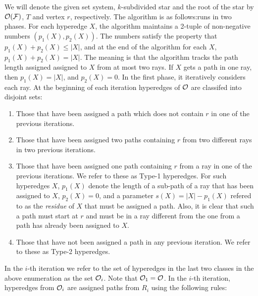 \documentclass[11pt,letter]{../lib/llncs}
\def\cF{{\cal F}}
\def\cO{{\cal O}}
\def\xnoindent{\noindent} %
\begin{document}
\xnoindent We will denote the given set system, $k$-subdivided star and the root of the
star by $\cO(\cF)$, $T$ and vertex $r$, respectively.  
 The algorithm is as follows:runs in two phases. For each hyperedge $X$, the algorithm maintains a 2-tuple of non-negative numbers $(p_1(X),p_2(X))$.  The numbers satisfy the property
that $p_1(X)+p_2(X) \leq |X|$, and at the end of the algorithm for each $X$, $p_1(X) + p_2(X) = |X|$.  The meaning is that the algorithm tracks the path length assigned assigned to
$X$ from at most two rays.  If $X$ gets a path in one ray, then $p_1(X) = |X|$, and $p_2(X)=0$.  In the first phase, it iteratively considers each ray.  At the beginning of each iteration  hyperedges of $\cO$ are classifed
into disjoint sets: 
\begin{enumerate}
\item Those that have been assigned a path which does not contain $r$ in one of the previous iterations.  
\item Those that have been assigned two paths containing $r$ from two different rays in two previous iterations.  
\item Those that have been assigned one path containing $r$ from a ray in one of the previous iterations.  We refer to these as Type-1 hyperedges. For such hyperedges $X$, $p_1(X)$
denote the length of a sub-path of a ray that has been assigned to $X$, $p_2(X) = 0$, and
a parameter $s(X)=|X|-p_1(X)$ refered to as the {\em residue} of $X$ that must be assigned a path.  Also, it is clear that such a path must start at $r$ and must be in a ray different from the one from a path has already been assigned to $X$.  
\item Those that have not been assigned a path in any previous iteration.  We refer to these as Type-2 hyperedges.
\end{enumerate}
In the $i$-th iteration we refer to the set of hyperedges in the last two classes in the above enumeration as the set $\cO_i$.  Note that $\cO_1 = \cO$.  In the $i$-th iteration, hyperedges from $\cO_i$ are assigned paths from $R_i$ using the following rules:
\end{document}
